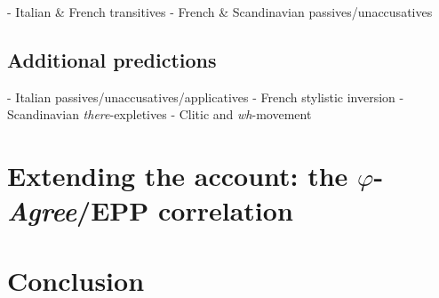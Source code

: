 \documentclass[11pt, letterpaper]{paper_nick}
\begin{document}
- Italian \& French transitives
- French \& Scandinavian passives/unaccusatives

\subsection{Additional predictions}
- Italian passives/unaccusatives/applicatives
- French stylistic inversion
- Scandinavian \emph{there}-expletives
- Clitic and \emph{wh}-movement

\section{Extending the account: the $\varphi$-\emph{Agree}/EPP correlation}

\section{Conclusion}



\setlength{\bibsep}{0pt}

\end{document}
